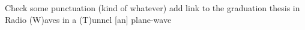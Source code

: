 Check some punctuation (kind of whatever)
add link to the graduation thesis
in Radio (W)aves in a (T)unnel [an] plane-wave
